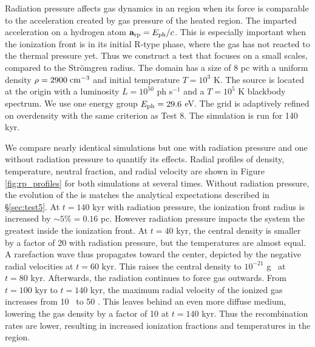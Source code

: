 \documentclass[useAMS,usenatbib]{mn2e}
\begin{document}
\begin{figure*}
  \caption{\label{fig:rp_profiles} (a) No radiation pressure.
    Radial profiles of (clockwise from top left) density, temperature,
    radial velocity, and neutral fraction.  Time units in the legend
    are in kyr.  (b) Radial profiles with radiation pressure.  The
    momentum transferred to the gas drives out the gas at higher
    velocities than without radiation pressure.  Afterwards the
    central region is under-pressurized, and the gas infalls toward the
    center, as seen at t = 60 kyr.  Then the radiation pressure
    continues to force the gas outwards, increasing gas velocities up
    to 50 km/s.}
\end{figure*}

Radiation pressure affects gas dynamics in an \hii region when
its force is comparable to the acceleration created by gas pressure of
the heated region.  The imparted acceleration on a hydrogen atom
$\mathbf{a}_{\rm rp} = E_{\rm ph}/c$.  This is especially important
when the ionization front is in its initial R-type phase, where the
gas has not reacted to the thermal pressure yet.  Thus we construct a
test that focuses on a small scales, compared to the Str\"{o}mgren
radius.  The domain has a size of 8 pc with a uniform density $\rho =
2900\;\cubecm$ and initial temperature $T = 10^3$ K.  The source is
located at the origin with a luminosity $L = 10^{50}$ ph s$^{-1}$ and
a $T=10^5$ K blackbody spectrum.  We use one energy group $E_{\rm ph}
= 29.6$ eV.  The grid is adaptively refined on overdensity with the
same criterion as Test 8.  The simulation is run for 140 kyr.

We compare nearly identical simulations but one with radiation
pressure and one without radiation pressure to quantify its effects.
Radial profiles of density, temperature, neutral fraction, and radial
velocity are shown in Figure \ref{fig:rp_profiles} for both
simulations at several times.  Without radiation pressure, the
evolution of the \hii is matches the analytical expectations
described in \S\ref{sec:test5}.  At $t=140$ kyr with radiation
pressure, the ionization front radius is increased by $\sim5\% = 0.16$
pc.  However radiation pressure impacts the system the greatest inside
the ionization front.  At $t = 40$ kyr, the central density is smaller
by a factor of 20 with radiation pressure, but the temperatures are
almost equal.  A rarefaction wave thus propagates toward the center,
depicted by the negative radial velocities at $t = 60$ kyr.  This
raises the central density to $10^{-21}$ g \cubecm~at $t = 80$ kyr.
Afterwards, the radiation continues to force gas outwards.  From $t =
100$ kyr to $t = 140$ kyr, the maximum radial velocity of the ionized
gas increases from 10 \kms~to 50 \kms.  This leaves behind an even
more diffuse medium, lowering the gas density by a factor of 10 at $t
= 140$ kyr.  Thus the recombination rates are lower, resulting in
increased ionization fractions and temperatures in the \hii
region.
\end{document}
